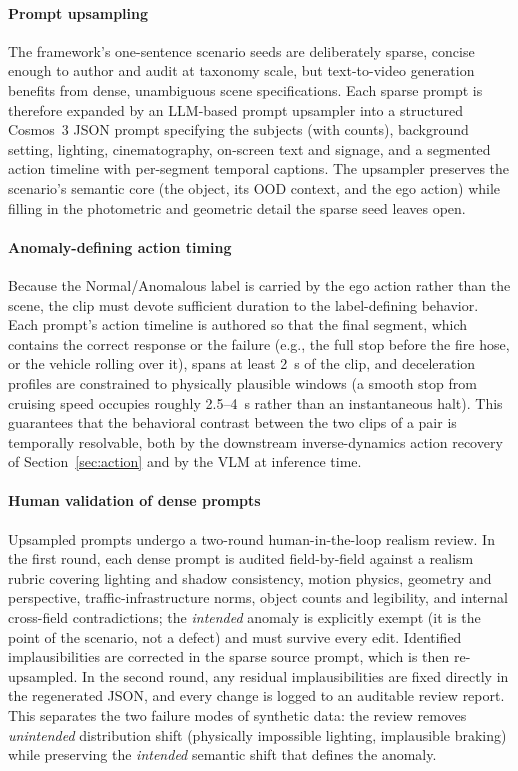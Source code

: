 \documentclass[conference]{IEEEtran}
\begin{document}
\paragraph{Prompt upsampling} The framework's one-sentence scenario seeds are deliberately sparse, concise enough to author and audit at taxonomy scale, but text-to-video generation benefits from dense, unambiguous scene specifications. Each sparse prompt is therefore expanded by an LLM-based prompt upsampler into a structured Cosmos~3 JSON prompt specifying the subjects (with counts), background setting, lighting, cinematography, on-screen text and signage, and a segmented action timeline with per-segment temporal captions. The upsampler preserves the scenario's semantic core (the object, its OOD context, and the ego action) while filling in the photometric and geometric detail the sparse seed leaves open.

\paragraph{Anomaly-defining action timing} Because the Normal/Anomalous label is carried by the ego action rather than the scene, the clip must devote sufficient duration to the label-defining behavior. Each prompt's action timeline is authored so that the final segment, which contains the correct response or the failure (e.g., the full stop before the fire hose, or the vehicle rolling over it), spans at least 2~s of the clip, and deceleration profiles are constrained to physically plausible windows (a smooth stop from cruising speed occupies roughly 2.5--4~s rather than an instantaneous halt). This guarantees that the behavioral contrast between the two clips of a pair is temporally resolvable, both by the downstream inverse-dynamics action recovery of Section~\ref{sec:action} and by the VLM at inference time.

\paragraph{Human validation of dense prompts} Upsampled prompts undergo a two-round human-in-the-loop realism review. In the first round, each dense prompt is audited field-by-field against a realism rubric covering lighting and shadow consistency, motion physics, geometry and perspective, traffic-infrastructure norms, object counts and legibility, and internal cross-field contradictions; the \emph{intended} anomaly is explicitly exempt (it is the point of the scenario, not a defect) and must survive every edit. Identified implausibilities are corrected in the sparse source prompt, which is then re-upsampled. In the second round, any residual implausibilities are fixed directly in the regenerated JSON, and every change is logged to an auditable review report. This separates the two failure modes of synthetic data: the review removes \emph{unintended} distribution shift (physically impossible lighting, implausible braking) while preserving the \emph{intended} semantic shift that defines the anomaly.
\end{document}
